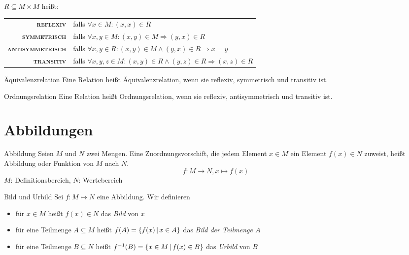 $R \subseteq M\times M$ heißt:

\medskip
\renewcommand{\arraystretch}{1.4}
\begin{tabular}{>{\bfseries\scshape}r l}
	reflexiv & falls $\forall x\in M : (x,x)\in R$\\
	symmetrisch & falls $\forall x,y \in M : (x,y)\in M \Rightarrow (y,x) \in R$\\
	antisymmetrisch & falls $\forall x,y \in R : (x,y)\in M \wedge (y,x)\in R \Rightarrow x=y$\\
	transitiv & falls $\forall x,y,z \in M : (x,y)\in R \wedge (y,z)\in R \Rightarrow (x,z)\in R$
\end{tabular}
\medskip

\begin{definition}{Äquivalenzrelation}
	Eine Relation heißt Äquivalenzrelation, wenn sie reflexiv, symmetrisch und transitiv ist.
\end{definition}


\begin{definition}{Ordnungsrelation}
	Eine Relation heißt Ordnungsrelation, wenn sie reflexiv, antisymmetrisch und transitiv ist.
\end{definition}


\section{Abbildungen}
\begin{definition}{Abbildung}
	Seien $M$ und $N$ zwei Mengen. Eine Zuordnungsvorschift, die jedem Element $x\in M$ ein Element $f(x)\in N$ zuweist, heißt Abbildung oder Funktion von $M$ nach $N$.
	\begin{equation*}
	  f:M\rightarrow N, x\mapsto f(x)
	\end{equation*}
	$M$: Definitionsbereich, $N$: Wertebereich
\end{definition}


\begin{definition}{Bild und Urbild}
	Sei $f:M\mapsto N$ eine Abbildung. Wir definieren
	\begin{itemize}
	  \item für $x\in M$ heißt $f(x)\in N$ das \emph{Bild} von $x$
	  \item für eine Teilmenge $A\subseteq M$ heißt $f(A)=\left\{ f(x) \,\middle|\, x\in A \right\}$ das \emph{Bild der Teilmenge  $A$}
	  \item für eine Teilmenge $B\subseteq N$ heißt $f^{-1}(B) = \left\{ x\in M \,\middle|\, f(x)\in B \right\}$ das \emph{Urbild} von $B$
	\end{itemize}
\end{definition}


